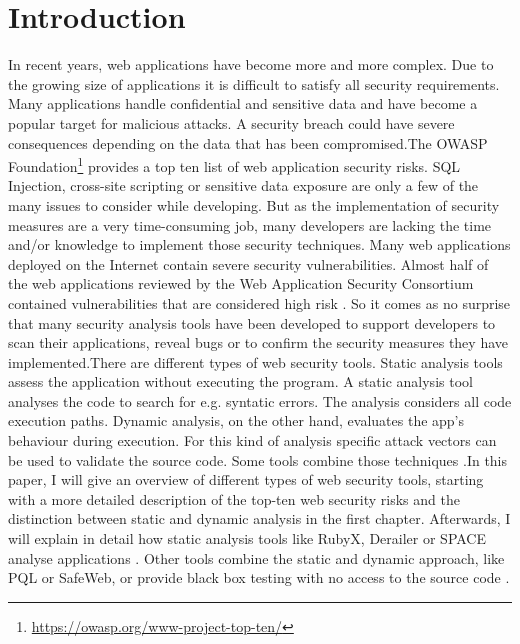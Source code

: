 \section{Introduction}
\label{section:Introduction}
In recent years, web applications have become more and more complex. Due to the growing size of applications it is difficult to satisfy all security requirements. Many applications handle confidential and sensitive data and have become a popular target for malicious attacks. A security breach could have severe consequences depending on the data that has been compromised.\newline The OWASP Foundation\footnote{ \url{https://owasp.org/www-project-top-ten/}} provides a top ten list of web application security risks. SQL Injection, cross-site scripting or sensitive data exposure are only a few of the many issues to consider while developing. But as the implementation of security measures are a very time-consuming job, many developers are lacking the time and/or knowledge to implement those security techniques. Many web applications deployed on the Internet contain severe security vulnerabilities. Almost half of the web applications reviewed by the Web Application Security Consortium contained vulnerabilities that are considered high risk \autocite[2]{Li2014}.
So it comes as no surprise that many security analysis tools have been developed to support developers to scan their applications, reveal bugs or to confirm the security measures they have implemented.\newline There are different types of web security tools. Static analysis tools assess the application without executing the program. A static analysis tool analyses the code to search for e.g. syntatic errors. The analysis considers all code execution paths. Dynamic analysis, on the other hand, evaluates the app's behaviour during execution. For this kind of analysis specific attack vectors can be used to validate the source code. Some tools combine those techniques \autocite[]{Lam2008,Hosek2011}.\newline In this paper, I will give an overview of different types of web security tools, starting with a more detailed description of the top-ten web security risks and the distinction between static and dynamic analysis in the first chapter. Afterwards, I will explain in detail how static analysis tools like RubyX, Derailer or SPACE analyse applications \autocite[]{Chaudhuri2010, Near2014, Near2016}.  Other tools combine the static and dynamic approach, like PQL or SafeWeb, or provide black box testing with no access to the source code \autocite[]{Lam2008,Hosek2011,Araujo2018}.




